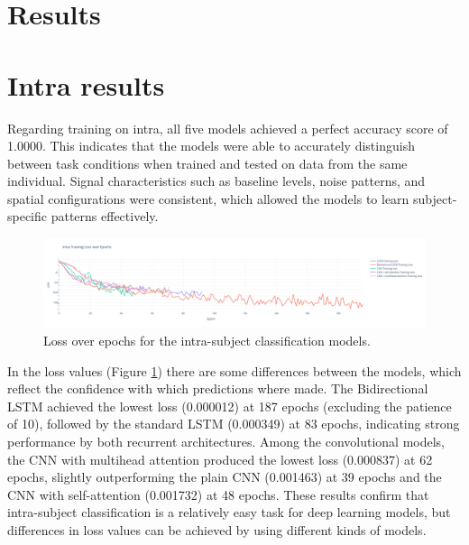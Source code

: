 \documentclass[conference]{IEEEtran}
\begin{document}
\section{Results}

\section{Intra results}
Regarding training on intra, all five models achieved a perfect accuracy score of 1.0000. This indicates that the models were able to accurately distinguish between task conditions when trained and tested on data from the same individual. Signal characteristics such as baseline levels, noise patterns, and spatial configurations were consistent, which allowed the models to learn subject-specific patterns effectively.

\begin{figure}[t]
    \centering
    \includegraphics[width=\textwidth]{figures/loss_intra_res.png}
    \caption{Loss over epochs for the intra-subject classification models.}
    \label{fig:intra_loss_over_epoch}
\end{figure}

In the loss values (Figure \ref{fig:intra_loss_over_epoch}) there are some differences between the models, which reflect the confidence with which predictions where made. The Bidirectional LSTM achieved the lowest loss (0.000012) at 187 epochs (excluding the patience of 10), followed by the standard LSTM (0.000349) at 83 epochs, indicating strong performance by both recurrent architectures. Among the convolutional models, the CNN with multihead attention produced the lowest loss (0.000837) at 62 epochs, slightly outperforming the plain CNN (0.001463) at 39 epochs and the CNN with self-attention (0.001732) at 48 epochs. These results confirm that intra-subject classification is a relatively easy task for deep learning models, but differences in loss values can be achieved by using different kinds of models.
\end{document}
